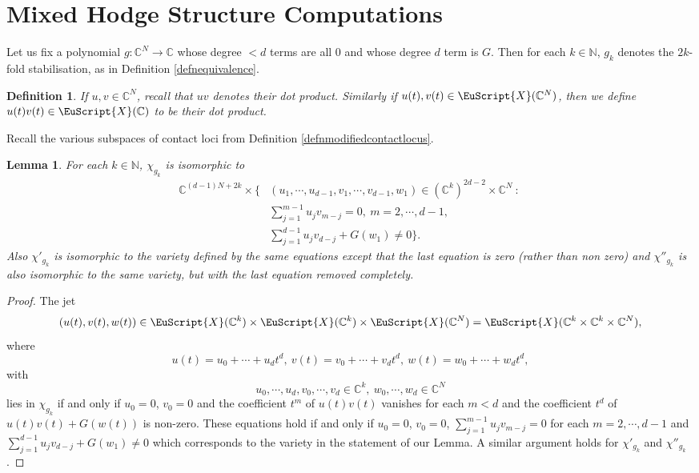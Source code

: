 \documentclass[11pt]{amsart}
\newtheorem{defn}[thm]{Definition}
\newtheorem{lemma}[thm]{Lemma}
\newcommand{\scrX}{\EuScript{X}}
\newcommand{\bC}{\mathbb{C}}
\newcommand{\bN}{\mathbb{N}}
\numberwithin{equation}{section}
\begin{document}
\section{Mixed Hodge Structure Computations}\label{sec:mhs}

Let us fix a polynomial $g : \bC^N \to \bC$ whose degree $<d$ terms are all $0$ and whose degree $d$ term is $G$.
Then for each $k \in \bN$, $g_k$
denotes the $2k$-fold stabilisation, as in Definition \ref{defnequivalence}.


\begin{defn}
	If $u,v \in \bC^N$, recall that  $uv$ denotes their dot product.
	Similarly if $u(t),v(t) \in \scrX(\bC^N)$, then we define $u(t)v(t) \in \scrX(\bC)$ to be their dot product.
\end{defn}

Recall the various subspaces of  contact loci  from Definition \ref{defnmodifiedcontactlocus}.

\begin{lemma} \label{LemmaChiComputation}
	For each $k \in \bN$,
	$\chi_{g_k}$ is isomorphic to
	\begin{equation} \label{eqnMainChiEqn}
		\begin{aligned}
			\bC^{(d-1)N + 2k} \times \Big\{ & (u_1,\cdots,u_{d-1},v_1,\cdots,v_{d-1},w_1) \in (\bC^k)^{2d-2} \times \bC^N \ : \ \\
			                                & \sum_{j=1}^{m-1} u_j v_{m-j} = 0, \ m=2,\cdots,d-1,                               \\ &
			\sum_{j=1}^{d-1} u_j v_{d-j} + G(w_1) \neq 0
			\Big\}.
		\end{aligned}
	\end{equation}
	Also $\chi'_{g_k}$ is isomorphic to  the  variety defined by the same equations except that the last equation is zero (rather than non zero) and $\chi''_{g_k}$ is also isomorphic to the same variety, but with the last equation removed completely.
\end{lemma}
\begin{proof}
	The jet
	\begin{equation} \label{eqnuvwoft}
		(u(t),v(t),w(t)) \in \scrX(\bC^k) \times \scrX(\bC^k) \times \scrX(\bC^N) = \scrX(\bC^k \times \bC^k \times \bC^N),
	\end{equation}
	where
	\[
		u(t)=u_0 + \cdots + u_dt^d, \  v(t)=v_0+\cdots+v_dt^d, \  w(t)=w_0+\cdots+w_dt^d,
	\]
	with
	\[u_0,\cdots,u_d,v_0,\cdots,v_d \in \bC^k, \ w_0,\cdots,w_d \in \bC^N
	\] lies in $\chi_{g_k}$ if and only if $u_0=0$, $v_0=0$ and the coefficient $t^m$ of $u(t)v(t)$ vanishes for each $m <d$ and the coefficient $t^d$ of $u(t)v(t)+G(w(t))$ is non-zero. These equations hold if and only if $u_0=0$, $v_0=0$,
	$\sum_{j=1}^{m-1} u_j v_{m-j}=0$ for each $m=2,\cdots,d-1$
	and $\sum_{j=1}^{d-1} u_j v_{d-j}+G(w_1) \neq 0$ which corresponds to the variety in the statement of our Lemma.
	A similar argument holds for $\chi'_{g_k}$ and $\chi''_{g_k}$.
\end{proof}
\end{document}
